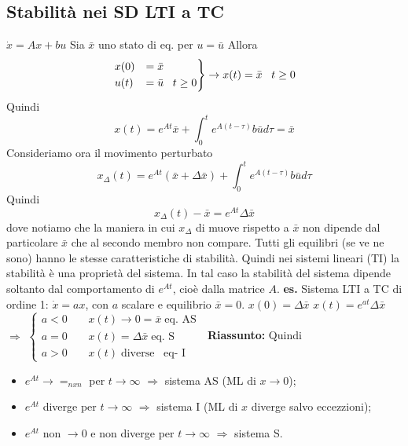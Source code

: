 \subsection*{Stabilità nei SD LTI a TC}
$\dot{x} = Ax + bu$\newline
Sia $\bar{x}$ uno stato di eq. per $u = \bar{u}$\newline
Allora
\[
    \begin{rcases}
        x(0) &= \bar{x}\\
        u(t) &= \bar{u} \;\;\; t\geq 0
    \end{rcases} \rightarrow  x(t) = \bar{x} \;\;\;t \geq 0
\]
Quindi
\[
    x(t) = e^{At} \bar{x} + \int_{0}^{t}e^{A(t-\tau)} b \bar{u} d \tau = \bar{x}
\]
Consideriamo ora il movimento perturbato 
\[
    x_{\Delta}(t) = e^{At}(\bar{x} + \Delta \bar{x}) + \int_{0}^{t}e^{A(t- \tau)}b \bar{u} d \tau
\]
Quindi 
\[
    x_\Delta (t) - \bar{x} = e^{At} \Delta \bar{x}
\]
dove notiamo che la maniera in cui $x_\Delta$ di muove rispetto a $\bar{x}$ non dipende dal particolare $\bar{x}$ che al secondo membro non compare.\newline
\newline
Tutti gli equilibri (se ve ne sono) hanno le stesse caratteristiche di stabilità.\newline
Quindi nei sistemi lineari (TI) la stabilità è una proprietà del sistema.\newline
In tal caso la stabilità del sistema dipende soltanto dal comportamento di $e^{At}$, cioè dalla matrice $A$.\newline
\newline
\textbf{es.}  Sistema LTI a TC di ordine 1:\newline
$\dot{x} = a x$, con $a$ scalare e equilibrio $\bar{x} = 0$.\newline
$x(0) = \Delta \bar{x}$\newline
$x(t) = e^{at} \Delta \bar{x}$ $\Rightarrow $ $\begin{cases}
    a < 0 \;\;\;\; & x(t) \rightarrow  0 = \bar{x} \;\text{eq. AS}\;\\
    a = 0 \;\;\;\; & x(t) = \Delta \bar{x} \;\text{eq. S}\;\\
    a > 0 \;\;\;\; & x(t) \;\text{diverse}\;\;\;\text{eq- I}\;
\end{cases}$\newline
\newline
\textbf{Riassunto:}\newline
Quindi 
\begin{itemize}
    \item $e^{At} \rightarrow  =_{nxn}$ per $t \rightarrow  \infty$ $\Longrightarrow$ sistema AS (ML di $x \rightarrow  0$);
    \item $e^{At}$ diverge per $t \rightarrow  \infty$ $\Longrightarrow$ sistema I (ML di $x$ diverge salvo eccezzioni);
    \item $e^{At}$ non $\rightarrow  0$ e non diverge per $t \rightarrow  \infty$ $\Longrightarrow$ sistema S.
\end{itemize}
